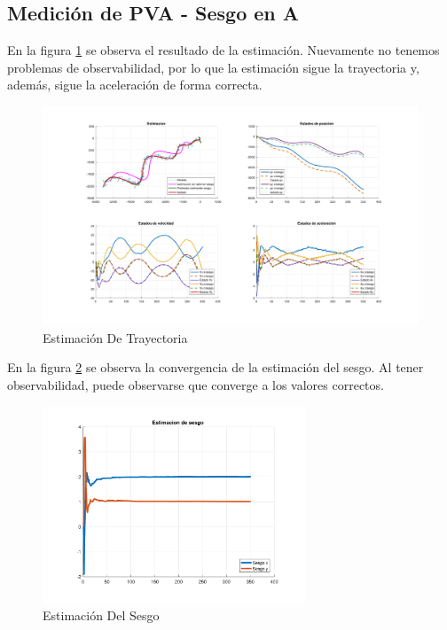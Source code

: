 
\subsection{Medición de PVA - Sesgo en A}

	En la figura \ref{fig:ej3f} se observa el resultado de la estimación. Nuevamente no tenemos problemas de observabilidad, por lo que la estimación sigue la trayectoria y, además, sigue la aceleración de forma correcta.

	\begin{figure}[H]
		\centering
		\includegraphics[width=1.0\textwidth,keepaspectratio]{Figuras/graf_ej4f.pdf}
		\caption{Estimación De Trayectoria}
		\label{fig:ej3f}
	\end{figure}
	
	En la figura \ref{fig:ej3f_bias} se observa la convergencia de la estimación del sesgo. Al tener observabilidad, puede observarse que converge a los valores correctos.
	
	\begin{figure}[H]
		\centering
		\includegraphics[width=0.7\textwidth,keepaspectratio]{Figuras/bias_ej4f.pdf}
		\caption{Estimación Del Sesgo}
		\label{fig:ej3f_bias}
	\end{figure}
	
